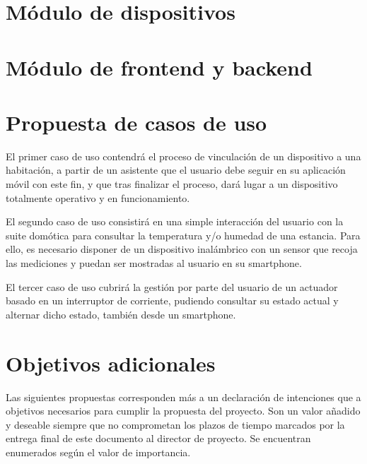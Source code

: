 \vspace{1cm}


\section{Módulo de dispositivos}
\label{ch:Capitulo3.3}



\section{Módulo de frontend y backend}
\label{ch:Capitulo3.4}


\section{Propuesta de casos de uso}
\label{ch:Capitulo3.5}

El primer caso de uso contendrá el proceso de vinculación de un dispositivo a una habitación, a partir de un asistente que el usuario debe seguir en su aplicación móvil con este fin, y que tras finalizar el proceso, dará lugar a un dispositivo totalmente operativo y en funcionamiento.

El segundo caso de uso consistirá en una simple interacción del usuario con la suite domótica para consultar la temperatura y/o humedad de una estancia. Para ello, es necesario disponer de un dispositivo inalámbrico con un sensor que recoja las mediciones y puedan ser mostradas al usuario en su smartphone.

El tercer caso de uso cubrirá la gestión por parte del usuario de un actuador basado en un interruptor de corriente, pudiendo consultar su estado actual y alternar dicho estado, también desde un smartphone.

\section{Objetivos adicionales}
\label{ch:Capitulo3.6}

Las siguientes propuestas corresponden más a un declaración de intenciones que a objetivos necesarios para cumplir la propuesta del proyecto. Son un valor añadido y deseable siempre que no comprometan los plazos de tiempo marcados por la entrega final de este documento al director de proyecto. Se encuentran enumerados según el valor de importancia.


